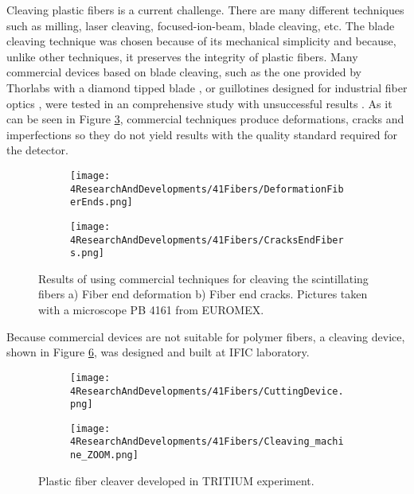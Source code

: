 Cleaving plastic fibers is a current challenge. There are many different techniques such as milling, laser cleaving, focused-ion-beam, blade cleaving, etc. The blade cleaving technique was chosen because of its mechanical simplicity and because, unlike other techniques, it preserves the integrity of plastic fibers. Many commercial devices based on blade cleaving, such as the one provided by Thorlabs with a diamond tipped blade \cite{DiamondThorlabs}, or guillotines designed for industrial fiber optics \cite{GuillotineIFO}, were tested in an comprehensive study with unsuccessful results \cite{TFGAlberto}. As it can be seen in Figure \ref{fig:BadCleavesOfFibers}, commercial techniques produce deformations, cracks and imperfections so they do not yield results with the quality standard required for the detector.
\begin{figure}
\centering
    \begin{subfigure}[b]{0.5\textwidth}
    \centering
    \texttt{[image: 4ResearchAndDevelopments/41Fibers/DeformationFiberEnds.png]}  
    \caption{\label{subfig:FiberEndDeformation}}
    \end{subfigure}
    \hfill
    \begin{subfigure}[b]{0.45\textwidth}
    \centering
    \texttt{[image: 4ResearchAndDevelopments/41Fibers/CracksEndFibers.png]}  
    \caption{\label{subfig:FiberEndCracks}}
    \end{subfigure}
 \caption{Results of using commercial techniques for cleaving the scintillating fibers a) Fiber end deformation b) Fiber end cracks. Pictures taken with a microscope PB 4161 from EUROMEX.}
 \label{fig:BadCleavesOfFibers}
\end{figure}
Because commercial devices are not suitable for polymer fibers, a cleaving device, shown in Figure \ref{fig:CleaveTRITIUMDevice}, was designed and built at IFIC laboratory.
\begin{figure}
\centering
    \begin{subfigure}[b]{0.5\textwidth}
    \centering
    \texttt{[image: 4ResearchAndDevelopments/41Fibers/CuttingDevice.png]}  
    \caption{\label{subfig:CleaveTRITIUMDevice1}}
    \end{subfigure}
    \hfill
    \begin{subfigure}[b]{0.45\textwidth}
    \centering
    \texttt{[image: 4ResearchAndDevelopments/41Fibers/Cleaving\_machine\_ZOOM.png]}  
    \caption{\label{subfig:CleaveTRITIUMDeviceZOOM}}
    \end{subfigure}
 \caption{Plastic fiber cleaver developed in TRITIUM experiment. \label{fig:CleaveTRITIUMDevice}}
\end{figure}
